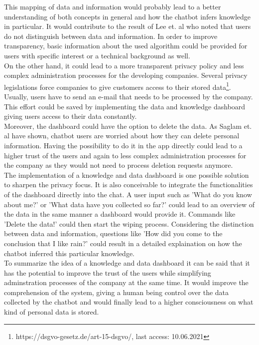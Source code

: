 \documentclass[sigconf, nonacm]{acmart}
\begin{document}
This mapping of data and information would probably lead to a better understanding of both concepts in general and how the chatbot infers knowledge in particular. It would contribute to the result of Lee et. al \cite{Lee2011} who noted that users do not distinguish between data and information.
In order to improve transparency, basic information about the used algorithm could be provided for users with specific interest or a technical background as well.
\\
On the other hand, it could lead to a more transparent privacy policy and less complex administration processes for the developing companies. Several privacy legislations force companies to give customers access to their stored data\footnote{https://dsgvo-gesetz.de/art-15-dsgvo/, last access: 10.06.2021}. Usually, users have to send an e-mail that needs to be processed by the company. This effort could be saved by
implementing the data and knowledge dashboard giving users access to their data constantly.
\\
Moreover, the dashboard could have the option to delete the data. As Saglam et. al \cite{Saglam2021} have shown, chatbot users are worried about how they can delete personal information. Having the possibility to do it in the app directly could lead to a higher trust of the users and again to less complex administration processes for the company
as they would not need to process deletion requests anymore.
\\
The implementation of a knowledge and data dashboard is one possible solution to sharpen the privacy focus. It is also conceivable to integrate the functionalities of the dashboard directly into the chat.
A user input such as 'What do you know about me?' or 'What data have you collected so far?' could lead to an overview of the data in the same manner a dashboard would provide it.
Commands like 'Delete the data!' could then start the wiping process. 
Considering the distinction between data and information, questions like 'How did you come to the conclusion that I like rain?' could result in a detailed explaination on how the chatbot inferred this particular knowledge.
\\
To summarize the idea of a knowledge and data dashboard it can be said that it has the potential to improve the trust of the users while simplifying adminstration processes of the company at the same time. 
It would improve the comprehension of the system, giving a human being control over the data collected by the chatbot and would finally lead to a higher consciousness on what kind of personal data is stored.
\end{document}
